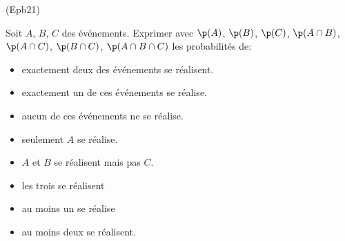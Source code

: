 \begin{tiny}(Epb21)\end{tiny} Soit $A$, $B$, $C$ des événements. Exprimer avec $\p(A)$, $\p(B)$, $\p(C)$, $\p(A\cap B)$, $\p(A\cap C)$, $\p(B\cap C)$, $\p(A\cap B \cap C)$ les probabilités de:
\begin{itemize}
 \item exactement deux des événements se réalisent.
 \item exactement un de ces événements se réalise.
 \item aucun de ces événements ne se réalise.
 \item seulement $A$ se réalise.
 \item $A$ et $B$ se réalisent mais pas $C$.
 \item les trois se réalisent
 \item au moins un se réalise
 \item au moins deux se réalisent.
\end{itemize}
 